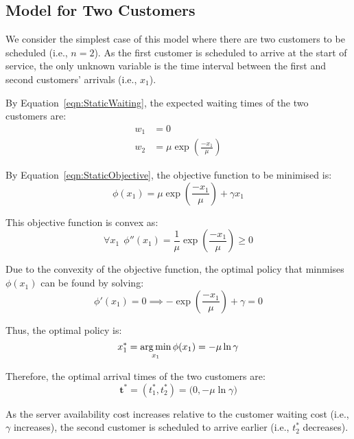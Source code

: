 \subsection{Model for Two Customers}
\label{sec:StaticTwoCust}

We consider the simplest case of this model where there are two customers to be scheduled (i.e., $n = 2$). As the first customer is scheduled to arrive at the start of service, the only unknown variable is the time interval between the first and second customers' arrivals (i.e., $x_{1}$).

By Equation~\ref{eqn:StaticWaiting}, the expected waiting times of the two customers are:
\begin{align}
	w_{1} & = 0 \\
	w_{2} & = \mu \exp \left( \frac{- x_{1}}{\mu} \right)
\end{align}

By Equation~\ref{eqn:StaticObjective}, the objective function to be minimised is:
\begin{equation}
	\phi (x_{1}) = \mu \exp \left( \frac{- x_{1}}{\mu} \right) + \gamma x_{1}
\end{equation}

This objective function is convex as:
\begin{equation}
	\forall x_{1} \ \ \phi'' (x_{1}) = \frac{1}{\mu} \exp \left( \frac{- x_{1}}{\mu} \right) \geq 0
\end{equation}

Due to the convexity of the objective function, the optimal policy that minmises $\phi (x_{1})$ can be found by solving:
\begin{equation}
	\phi' (x_{1}) = 0 \implies - \exp \left( \frac{- x_{1}}{\mu} \right) + \gamma = 0
\end{equation}

Thus, the optimal policy is:
\begin{equation}
	x_{1}^{*} = \operatorname*{arg\,min}_{x_{1}} \phi (x_{1}) = - \mu \ln \gamma
\end{equation}

Therefore, the optimal arrival times of the two customers are:
\begin{equation}
	\mathbf{t}^{*} = \left( t_{1}^{*}, t_{2}^{*} \right) = \Big( 0, - \mu \ln \gamma \Big)
\end{equation}

As the server availability cost increases relative to the customer waiting cost (i.e., $\gamma$ increases), the second customer is scheduled to arrive earlier (i.e., $t_{2}^{*}$ decreases).

